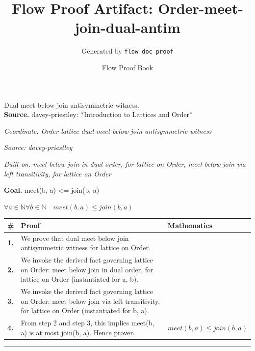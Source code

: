 \documentclass[11pt]{article}
\title{Flow Proof Artifact: Order-meet-join-dual-antim}
\author{Generated by \texttt{flow doc proof}}
\date{Flow Proof Book}
\theoremstyle{definition}
\begin{document}
\maketitle
Dual meet below join antisymmetric witness.\\[0.5em]
\textbf{Source.} davey-priestley: *Introduction to Lattices and Order*\\[0.5em]
\bigskip
{}\par
\smallskip\noindent\textit{Coordinate: Order \cdot lattice \cdot dual meet below join antisymmetric witness}\par
\smallskip\noindent\textit{Source: davey-priestley}\par
\smallskip\noindent\textit{Built on: meet below join in dual order, for lattice on Order, meet below join via left transitivity, for lattice on Order}\par
\medskip
\noindent\textbf{Goal.} meet(b, a) <= join(b, a)\par
\noindent$\displaystyle \forall a \in \mathbb{N} \forall b \in \mathbb{N}\quad meet(b, a) \le join(b, a)$\par
\medskip
\noindent
\begin{tabular}{@{} >{\raggedright\arraybackslash}p{} >{\raggedright\arraybackslash}p{} >{\raggedleft\arraybackslash}p{} @{}}
\textbf{\#} & \textbf{Proof} & \textbf{Mathematics} \\
\midrule
\textbf{1.} & We prove that dual meet below join antisymmetric witness for lattice on Order. & \\[0.45em]
\textbf{2.} & We invoke the derived fact governing lattice on Order: meet below join in dual order, for lattice on Order (instantiated for a, b). & \\[0.45em]
\textbf{3.} & We invoke the derived fact governing lattice on Order: meet below join via left transitivity, for lattice on Order (instantiated for b, a). & \\[0.45em]
\textbf{4.} & From step 2 and step 3, this implies meet(b, a) is at most join(b, a). Hence proven. & $\displaystyle meet(b, a) \le join(b, a)$ \\[0.45em]
\bottomrule
\end{tabular}
\label{thm:Order-lattice-dual_meet_below_join_antisymmetric_witness}
\par\medskip\hrule
\end{document}
